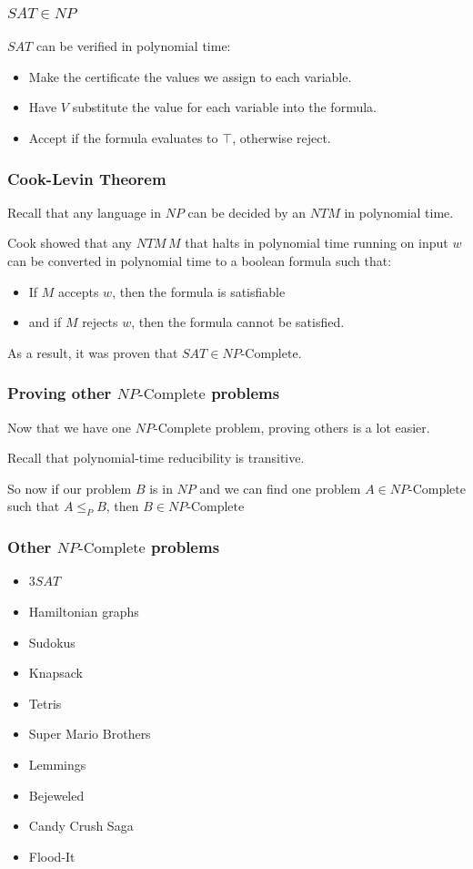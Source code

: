 \documentclass[aspectratio=169]{beamer}
\begin{document}
\begin{frame}
\frametitle{$SAT \in NP$}
$SAT$ can be verified in polynomial time:

\begin{itemize}
    \item<1-> Make the certificate the values we assign to each variable.
    \item<2-> Have $V$ substitute the value for each variable into the formula.
    \item<3-> Accept if the formula evaluates to $\top$, otherwise reject.
\end{itemize}
\end{frame}

\begin{frame}
\frametitle{Cook-Levin Theorem}
Recall that any language in $NP$ can be decided by an $NTM$ in polynomial time.

Cook showed that any $NTM\, M$ that halts in polynomial time running on input $w$ can be converted in polynomial time to a boolean formula such that:

\begin{itemize}
    \item If $M$ accepts $w$, then the formula is satisfiable
    \item and if $M$ rejects $w$, then the formula cannot be satisfied.
\end{itemize}

As a result, it was proven that $SAT \in NP\text{-Complete}$.
\end{frame}

\begin{frame}
\frametitle{Proving other $NP\text{-Complete}$ problems}

Now that we have one $NP\text{-Complete}$ problem, proving others is a lot easier.

Recall that polynomial-time reducibility is transitive.

So now if our problem $B$ is in $NP$ and we can find one problem $A \in NP\text{-Complete}$ such that $A \leq_P B$, then $B \in NP\text{-Complete}$
\end{frame}

\begin{frame}
\frametitle{Other $NP\text{-Complete}$ problems}
\begin{itemize}
    \item<1-> $3SAT$
    \item<2-> Hamiltonian graphs
    \item<3-> Sudokus
    \item<4-> Knapsack
    \item<5-> Tetris
    \item<6-> Super Mario Brothers
    \item<7-> Lemmings
    \item<8-> Bejeweled
    \item<9-> Candy Crush Saga
    \item<10-> Flood-It
\end{itemize}
\end{frame}
\end{document}
